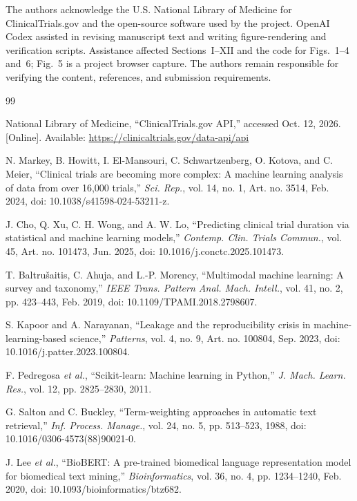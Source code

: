 \documentclass[10pt,letterpaper,twocolumn]{article}
\begin{document}
The authors acknowledge the U.S. National Library of Medicine for ClinicalTrials.gov and the open-source software used by the project. OpenAI Codex assisted in revising manuscript text and writing figure-rendering and verification scripts. Assistance affected Sections~I--XII and the code for Figs.~1--4 and~6; Fig.~5 is a project browser capture. The authors remain responsible for verifying the content, references, and submission requirements.

\begin{thebibliography}{99}
\footnotesize

National Library of Medicine, ``ClinicalTrials.gov API,'' accessed Oct. 12, 2026. [Online]. Available: \url{https://clinicaltrials.gov/data-api/api}

\balance
{}
N. Markey, B. Howitt, I. El-Mansouri, C. Schwartzenberg, O. Kotova, and C. Meier, ``Clinical trials are becoming more complex: A machine learning analysis of data from over 16,000 trials,'' \emph{Sci. Rep.}, vol. 14, no. 1, Art. no. 3514, Feb. 2024, doi: 10.1038/s41598-024-53211-z.

J. Cho, Q. Xu, C. H. Wong, and A. W. Lo, ``Predicting clinical trial duration via statistical and machine learning models,'' \emph{Contemp. Clin. Trials Commun.}, vol. 45, Art. no. 101473, Jun. 2025, doi: 10.1016/j.conctc.2025.101473.

T. Baltru\v{s}aitis, C. Ahuja, and L.-P. Morency, ``Multimodal machine learning: A survey and taxonomy,'' \emph{IEEE Trans. Pattern Anal. Mach. Intell.}, vol. 41, no. 2, pp. 423--443, Feb. 2019, doi: 10.1109/TPAMI.2018.2798607.

S. Kapoor and A. Narayanan, ``Leakage and the reproducibility crisis in machine-learning-based science,'' \emph{Patterns}, vol. 4, no. 9, Art. no. 100804, Sep. 2023, doi: 10.1016/j.patter.2023.100804.

F. Pedregosa \emph{et al.}, ``Scikit-learn: Machine learning in Python,'' \emph{J. Mach. Learn. Res.}, vol. 12, pp. 2825--2830, 2011.

G. Salton and C. Buckley, ``Term-weighting approaches in automatic text retrieval,'' \emph{Inf. Process. Manage.}, vol. 24, no. 5, pp. 513--523, 1988, doi: 10.1016/0306-4573(88)90021-0.

J. Lee \emph{et al.}, ``BioBERT: A pre-trained biomedical language representation model for biomedical text mining,'' \emph{Bioinformatics}, vol. 36, no. 4, pp. 1234--1240, Feb. 2020, doi: 10.1093/bioinformatics/btz682.


\end{thebibliography}
\end{document}
